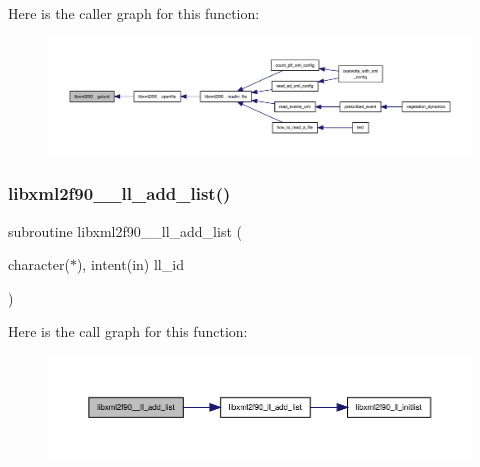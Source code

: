 Here is the caller graph for this function\+:
\nopagebreak
\begin{figure}[H]
\begin{center}
\leavevmode
\includegraphics[width=350pt]{libxml2f90_8f90__pp_8f90_a91985cd2da8e09ba96809c73c6fa0286_icgraph}
\end{center}
\end{figure}
\mbox{\label{libxml2f90_8f90__pp_8f90_a9f50298bda8735c41959e4e4275d97bd}} 
\subsubsection{\texorpdfstring{libxml2f90\+\_\+\+\_\+ll\+\_\+add\+\_\+list()}{libxml2f90\_\_ll\_add\_list()}}
{\footnotesize\ttfamily subroutine libxml2f90\+\_\+\+\_\+ll\+\_\+add\+\_\+list (\begin{DoxyParamCaption}\item[{character($\ast$), intent(in)}]{ll\+\_\+id }\end{DoxyParamCaption})}

Here is the call graph for this function\+:
\nopagebreak
\begin{figure}[H]
\begin{center}
\leavevmode
\includegraphics[width=350pt]{libxml2f90_8f90__pp_8f90_a9f50298bda8735c41959e4e4275d97bd_cgraph}
\end{center}
\end{figure}
\mbox{\label{libxml2f90_8f90__pp_8f90_ab78ccc23aca850d7f57e4cbb417fa8a3}} 
